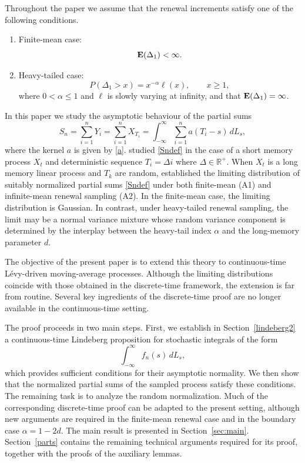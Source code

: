 \documentclass[preprint,12pt]{article}
\begin{document}
Throughout the paper we assume that the renewal increments satisfy one of the following conditions.

\begin{enumerate}
\item[(A1)] Finite-mean case:
$$
{\bf E}(\Delta_1)<\infty.
$$

\item[(A2)] Heavy-tailed case:
$$
P(\Delta_1>x)=x^{-\alpha}\ell(x), \qquad x\ge1,
$$
where $0<\alpha\le1$ and $\ell$ is slowly varying at infinity, and that ${\bf E}(\Delta_1)=\infty$.
\end{enumerate}
In this paper we study the asymptotic behaviour of the partial sums
\begin{equation}\label{Sndef}
S_n=
\sum_{i=1}^{n}Y_i =
\sum_{i=1}^{n}X_{T_i}
=\int_{-\infty}^{\infty}
\sum_{i=1}^{n}a(T_i-s)\,dL_s,
\end{equation}
where the kernel $a$ is given by \eqref{a}. \cite{CohenLindner2013} studied \eqref{Sndef} in the case of a short memory process $X_t$ and deterministic sequence $T_i=\Delta i$ where $\Delta\in\mathbb{R}^+$.  When $X_t$ is a long memory linear process  and  $T_k$ are random,   \cite{ouldhaye2024asymptoticsirregularlyobservedlong}  established the limiting distribution of suitably normalized partial sums \eqref{Sndef} under both finite-mean {\rm(A1)} and infinite-mean renewal sampling {\rm(A2)}. In the finite-mean case, the limiting distribution is Gaussian. In contrast, under heavy-tailed renewal sampling, the limit may be a normal variance mixture whose random variance component is determined by the interplay between the heavy-tail index $\alpha$ and the long-memory parameter $d$.

The objective of the present paper is to extend this theory to
continuous-time L\'evy-driven moving-average processes. Although the limiting
distributions coincide with those obtained in the discrete-time framework, the
extension is far from routine. Several key ingredients of the discrete-time
proof are no longer available in the continuous-time setting.

The proof proceeds in two main steps. First, we establish in
Section~\ref{lindeberg2} a continuous-time Lindeberg proposition for stochastic
integrals of the form
$$
\int_{-\infty}^{\infty}f_n(s)\,dL_s,
$$
which provides  sufficient conditions for their asymptotic normality. We then
show that the normalized partial sums of the sampled process satisfy these
conditions. The remaining task is to analyze the random normalization. Much of
the corresponding discrete-time proof can be adapted to the present setting,
although new arguments are required in the finite-mean renewal case and in the
boundary case $\alpha=1-2d$. The main result is presented in Section~\ref{sec:main}. Section~\ref{parts} contains the remaining technical arguments required for its proof, together with the proofs of the auxiliary lemmas.
\end{document}
